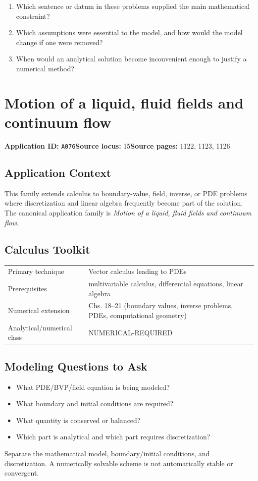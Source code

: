 \documentclass[11pt]{book}
\newcommand{\pid}[1]{\texttt{#1}}
\begin{document}
\begin{reflectionbox}\begin{enumerate}
\item Which sentence or datum in these problems supplied the main mathematical constraint?
\item Which assumptions were essential to the model, and how would the model change if one were removed?
\item When would an analytical solution become inconvenient enough to justify a numerical method?
\end{enumerate}\end{reflectionbox}
\chapter{Motion of a liquid, fluid fields and continuum flow}\label{app:A076}
\textbf{Application ID:} \pid{A076}\quad \textbf{Source locus:} 15\quad \textbf{Source pages:} 1122, 1123, 1126
\section*{Application Context}
This family extends calculus to boundary-value, field, inverse, or PDE problems where discretization and linear algebra frequently become part of the solution. The canonical application family is \emph{Motion of a liquid, fluid fields and continuum flow}.
\section*{Calculus Toolkit}
\begin{tabularx}{\textwidth}{@{}lX@{}}\toprule
Primary technique & Vector calculus leading to PDEs \\
Prerequisites & multivariable calculus, differential equations, linear algebra \\
Numerical extension & Chs. 18–21 (boundary values, inverse problems, PDEs, computational geometry) \\
Analytical/numerical class & NUMERICAL-REQUIRED \\
\bottomrule\end{tabularx}
\section*{Modeling Questions to Ask}\begin{itemize}
\item What PDE/BVP/field equation is being modeled?
\item What boundary and initial conditions are required?
\item What quantity is conserved or balanced?
\item Which part is analytical and which part requires discretization?
\end{itemize}
\begin{errorbox}Separate the mathematical model, boundary/initial conditions, and discretization. A numerically solvable scheme is not automatically stable or convergent.\end{errorbox}
\end{document}
